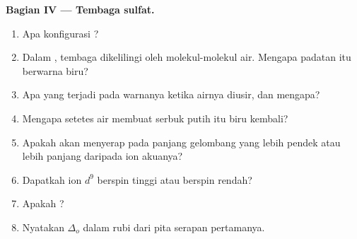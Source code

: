 \begin{problem}
\medskip
\noindent\textbf{Bagian IV --- Tembaga sulfat.}
\begin{enumerate}[resume]
  \item Apa konfigurasi ?
  \item Dalam , tembaga dikelilingi oleh molekul-molekul air.
        Mengapa padatan itu berwarna biru?
  \item Apa yang terjadi pada warnanya ketika airnya diusir, dan mengapa?
  \item Mengapa setetes air membuat serbuk putih itu biru kembali?
  \item Apakah  akan menyerap pada panjang gelombang yang
        lebih pendek atau lebih panjang daripada ion akuanya?
  \item Dapatkah ion $d^9$ berspin tinggi atau berspin rendah?
  \item Apakah  ?
  \item Nyatakan $\Delta_o$  dalam rubi dari pita serapan pertamanya.
\end{enumerate}
\end{problem}
